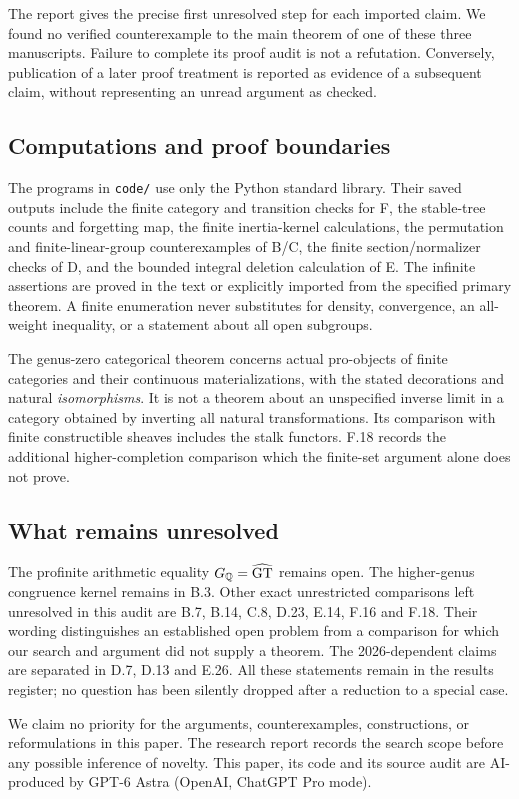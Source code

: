 The report gives the precise first unresolved step for each imported claim. We found no verified counterexample to the main theorem of one of these three manuscripts. Failure to complete its proof audit is not a refutation. Conversely, publication of a later proof treatment is reported as evidence of a subsequent claim, without representing an unread argument as checked.

\subsection{Computations and proof boundaries}
The programs in \texttt{code/} use only the Python standard library. Their saved outputs include the finite category and transition checks for F, the stable-tree counts and forgetting map, the finite inertia-kernel calculations, the permutation and finite-linear-group counterexamples of B/C, the finite section/normalizer checks of D, and the bounded integral deletion calculation of E. The infinite assertions are proved in the text or explicitly imported from the specified primary theorem. A finite enumeration never substitutes for density, convergence, an all-weight inequality, or a statement about all open subgroups.

The genus-zero categorical theorem concerns actual pro-objects of finite categories and their continuous materializations, with the stated decorations and natural \emph{isomorphisms}. It is not a theorem about an unspecified inverse limit in a category obtained by inverting all natural transformations. Its comparison with finite constructible sheaves includes the stalk functors. F.18 records the additional higher-completion comparison which the finite-set argument alone does not prove.

\subsection{What remains unresolved}
The profinite arithmetic equality $G_{\mathbb Q}=\widehat{\mathrm{GT}}$ remains open. The higher-genus congruence kernel remains in B.3. Other exact unrestricted comparisons left unresolved in this audit are B.7, B.14, C.8, D.23, E.14, F.16 and F.18. Their wording distinguishes an established open problem from a comparison for which our search and argument did not supply a theorem. The 2026-dependent claims are separated in D.7, D.13 and E.26. All these statements remain in the results register; no question has been silently dropped after a reduction to a special case.

We claim no priority for the arguments, counterexamples, constructions, or reformulations in this paper. The research report records the search scope before any possible inference of novelty. This paper, its code and its source audit are AI-produced by GPT-6 Astra (OpenAI, ChatGPT Pro mode).

